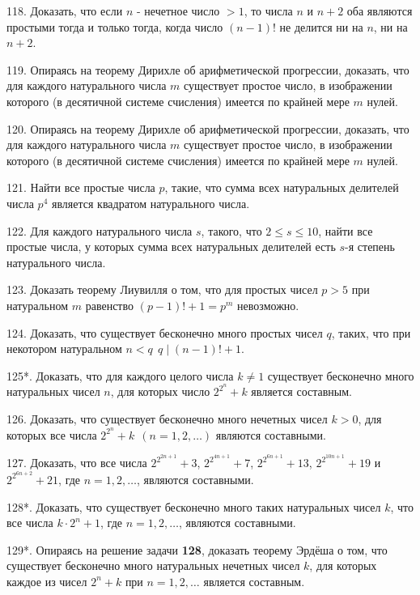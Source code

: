 \documentclass[12pt, a4paper, openany]{book}
\begin{document}
118. Доказать, что если $n$ - нечетное число $>1$, то числа $n$ и $n+2$ оба являются простыми тогда и только тогда, когда число $(n-1)!$ не делится ни на $n$, ни на $n+2$.

119. Опираясь на теорему Дирихле об арифметической прогрессии, доказать, что для каждого натурального числа $m$ существует простое число, в изображении которого (в десятичной системе счисления) имеется по крайней мере $m$ нулей.

120. Опираясь на теорему Дирихле об арифметической прогрессии, доказать, что для каждого натурального числа $m$ существует простое число, в изображении которого (в десятичной системе счисления) имеется по крайней мере $m$ нулей.

121. Найти все простые числа $p$, такие, что сумма всех натуральных делителей числа $p^4$ является квадратом натурального числа.

122. Для каждого натурального числа $s$, такого, что $2 \leq s \leq 10$, найти все простые числа, у которых сумма всех натуральных делителей есть $s$-я степень натурального числа.

123. Доказать теорему Лиувилля о том, что для простых чисел $p>5$ при натуральном $m$ равенство $(p-1)!+1=p^m$ невозможно.

124. Доказать, что существует бесконечно много простых чисел $q$, таких, что при некотором натуральном $n<q \ \ q \mid (n-1)!+1$.

125*. Доказать, что для каждого целого числа $\displaystyle k \neq 1$ существует бесконечно много натуральных чисел $n$, для которых число $2^{2^n} + k$ является составным.

126. Доказать, что существует бесконечно много нечетных чисел $k>0$, для которых все числа $\displaystyle 2^{2^n} + k \ \ (n=1, 2, \dots)$ являются составными.

127. Доказать, что все числа $\displaystyle 2^{2^{2n+1}} + 3$, $\displaystyle 2^{2^{4n+1}} + 7$, $\displaystyle 2^{2^{6n+1}} + 13$, $\displaystyle 2^{2^{10n+1}} + 19$ и $\displaystyle 2^{2^{6n+2}} + 21$, где $n=1, 2, \dots$, являются составными.

128*. Доказать, что существует бесконечно много таких натуральных чисел $k$, что все числа $k \cdot 2^n + 1$, где $n=1, 2, \dots$, являются составными.

129*. Опираясь на решение задачи \textbf{128}, доказать теорему Эрдёша о том, что существует бесконечно много натуральных нечетных чисел $k$, для которых каждое из чисел $2^n + k$ при $n=1, 2, \dots$ является составным.
\end{document}
